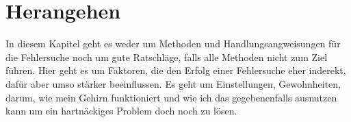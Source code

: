 \chapter{Herangehen}
\label{cha:herangehen}

\begin{abstractsec}
  In diesem Kapitel geht es weder um Methoden und Handlungsangweisungen für
  die Fehlersuche noch um gute Ratschläge, falls alle Methoden nicht zum Ziel
  führen. Hier geht es um Faktoren, die den Erfolg einer Fehlersuche eher
  inderekt, dafür aber umso stärker beeinflussen. Es geht um Einstellungen,
  Gewohnheiten, darum, wie mein Gehirn funktioniert und wie ich das
  gegebenenfalls ausnutzen kann um ein hartnäckiges Problem doch noch zu
  lösen.
\end{abstractsec}

